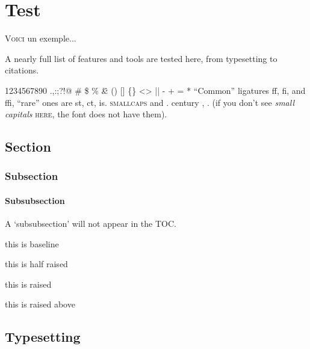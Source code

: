 \chapter{Test}
\label{sec:test}

\lettrine[lines=4, lraise=0.1, nindent=0em, slope=-.5em]%
{\textcolor{PolyU}{V}}{oici} un exemple... 

\lettrine[lines=6, slope=0.5em, findent=-1em]%
{A}{} nearly full list of features and tools are tested here, from typesetting to citations. 

\blindtext[1]

\bigskip



1234567890 .,:;?!@ \# \$ \% \^ \& \* () [] \{\} <> || - + = * ``Common'' ligatures ff, fi, and ffi, ``rare'' ones are st, ct, is. \textsc{smallcaps} and .      century \BC, \AD. (if you don't see \emph{small capitals} \textsc{here}, the font does not have them).

\noindent{\color{black}\rule{\linewidth}{0.2mm}} 

\section{Section}

\subsection{Subsection}

\subsubsection{Subsubsection} 

A `subsubsection' will not appear in the TOC. 


\noindent{\color{black}\rule{0.25\linewidth}{0.2mm}} this is baseline

\noindent{\color{black}\rule[0.5ex]{0.25\linewidth}{0.2mm}} this is half raised

\noindent{\color{black}\rule[1ex]{0.25\linewidth}{0.2mm}} this is raised

\noindent{\color{black}\rule[1.5ex]{0.25\linewidth}{0.2mm}} this is raised above

\section{Typesetting}

